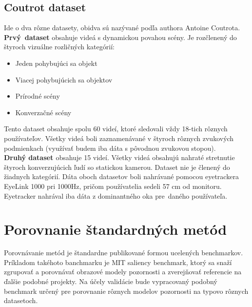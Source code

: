 \subsection{Coutrot dataset}
Ide o dva rôzne datasety, obidva sú nazývané podľa authora Antoine Coutrota.
\textbf{Prvý~dataset\cite{sound-1}} obsahuje videá s dynamickou povahou scény.
Je rozčlenený do štyroch vizuálne rozličných kategórií:
\begin{itemize}
  \item Jeden pohybujúci sa objekt
  \item Viacej pohybujúcich sa objektov
  \item Prírodné scény
  \item Konverzačné scény
\end{itemize}
Tento dataset obsahuje spolu 60 videí, ktoré sledovali vždy 18-tich rôznych používateľov.
Všetky videá boli zaznamenávané v štyroch rôznych zvukových podmienkach (využívať budem iba dáta s pôvodnou zvukovou stopou). \\
\textbf{Druhý dataset \cite{coutrot-database-2}} obsahuje 15 videí.
Všetky videá obsahujú nahraté stretnutie štyroch konverzujúcich ľudí so statickou kamerou.
Dataset nie je členený do žiadnych kategórií.
Dáta oboch datasetov boli nahrávané pomocou eyetrackera EyeLink 1000 pri 1000Hz, pričom používatelia sedeli 57 cm od monitoru.
Eyetracker nahrával iba dáta z dominantného oka pre~daného používateľa.

\section{Porovnanie štandardných metód}
Porovnávanie metód je štandardne publikované formou ucelených benchmarkov.
Príkladom takéhoto banchmarku je MIT saliency benchmark\cite{mit-saliency-benchmark}, ktorý sa snaží zgrupovať a porovnávať obrazové modely pozornosti a zverejňovať referencie na ďalšie podobné projekty.
Na účely validácie bude vypracovaný podobný benchmark určený pre porovnanie rôznych modelov pozornosti na typovo rôznych datasetoch.
